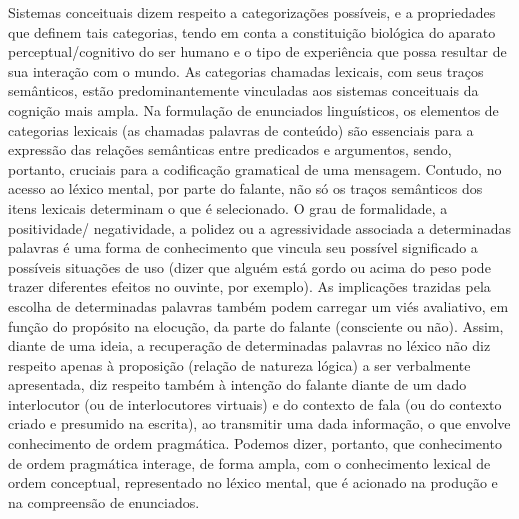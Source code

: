 \documentclass[output=paper,colorlinks,citecolor=brown,booklanguage=portuguese]{langscibook}
\begin{document}
Sistemas conceituais dizem respeito a categorizações possíveis, e a propriedades que definem tais categorias, tendo em conta a constituição biológica do aparato perceptual/cognitivo do ser humano e o tipo de experiência que possa resultar de sua interação com o mundo. As categorias chamadas lexicais, com seus traços semânticos, estão predominantemente vinculadas aos sistemas conceituais da cognição mais ampla. Na formulação de enunciados linguísticos, os elementos de categorias lexicais (as chamadas palavras de conteúdo) são essenciais para a expressão das relações semânticas entre predicados e argumentos, sendo, portanto, cruciais para a codificação gramatical de uma mensagem. Contudo, no acesso ao léxico mental, por parte do falante, não só os traços semânticos dos itens lexicais determinam o que é selecionado. O grau de formalidade, a positividade/ negatividade, a polidez ou a agressividade associada a determinadas palavras é uma forma de conhecimento que vincula seu possível significado a possíveis situações de uso (dizer que alguém está gordo ou acima do peso pode trazer diferentes efeitos no ouvinte, por exemplo). As implicações trazidas pela escolha de determinadas palavras também podem carregar um viés avaliativo, em função do propósito na elocução, da parte do falante (consciente ou não). Assim, diante de uma ideia, a recuperação de determinadas palavras no léxico não diz respeito apenas à proposição (relação de natureza lógica) a ser verbalmente apresentada, diz respeito também à intenção do falante diante de um dado interlocutor (ou de interlocutores virtuais) e do contexto de fala (ou do contexto criado e presumido na escrita), ao transmitir uma dada informação, o que envolve conhecimento de ordem pragmática. Podemos dizer, portanto, que conhecimento de ordem pragmática interage, de forma ampla, com o conhecimento lexical de ordem conceptual, representado no léxico mental, que é acionado na produção e na compreensão de enunciados. 
\end{document}

